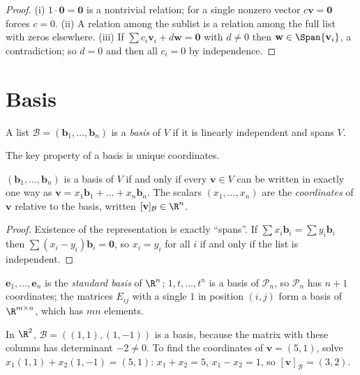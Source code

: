 \begin{proof}
(i) $1\cdot\mathbf{0}=\mathbf{0}$ is a nontrivial relation; for a single nonzero vector $c\mathbf{v}=\mathbf{0}$ forces $c=0$. (ii) A relation among the sublist is a relation among the full list with zeros elsewhere. (iii) If $\sum c_i\mathbf{v}_i+d\mathbf{w}=\mathbf{0}$ with $d\ne0$ then $\mathbf{w}\in\Span\{\mathbf{v}_i\}$, a contradiction; so $d=0$ and then all $c_i=0$ by independence.
\end{proof}

\section{Basis}

\begin{definition}[Basis]
A list $\mathcal{B}=(\mathbf{b}_1,\dots,\mathbf{b}_n)$ is a \emph{basis} of $V$ if it is linearly independent and spans $V$.
\end{definition}

The key property of a basis is unique coordinates.

\begin{theorem}\label{thm:uniquerep}
$(\mathbf{b}_1,\dots,\mathbf{b}_n)$ is a basis of $V$ if and only if every $\mathbf{v}\in V$ can be written in exactly one way as $\mathbf{v}=x_1\mathbf{b}_1+\dots+x_n\mathbf{b}_n$. The scalars $(x_1,\dots,x_n)$ are the \emph{coordinates} of $\mathbf{v}$ relative to the basis, written $[\mathbf{v}]_{\mathcal{B}}\in\R^n$.
\end{theorem}

\begin{proof}
Existence of the representation is exactly ``spans''. If $\sum x_i\mathbf{b}_i=\sum y_i\mathbf{b}_i$ then $\sum(x_i-y_i)\mathbf{b}_i=\mathbf{0}$, so $x_i=y_i$ for all $i$ if and only if the list is independent.
\end{proof}

\begin{example}
$\mathbf{e}_1,\dots,\mathbf{e}_n$ is the \emph{standard basis} of $\R^n$; $1,t,\dots,t^n$ is a basis of $\mathcal{P}_n$, so $\mathcal{P}_n$ has $n+1$ coordinates; the matrices $E_{ij}$ with a single $1$ in position $(i,j)$ form a basis of $\R^{m\times n}$, which has $mn$ elements.
\end{example}

\begin{example}
In $\R^2$, $\mathcal{B}=((1,1),(1,-1))$ is a basis, because the matrix with these columns has determinant $-2\ne0$. To find the coordinates of $\mathbf{v}=(5,1)$, solve $x_1(1,1)+x_2(1,-1)=(5,1)$: $x_1+x_2=5$, $x_1-x_2=1$, so $[\mathbf{v}]_{\mathcal{B}}=(3,2)$.
\end{example}

